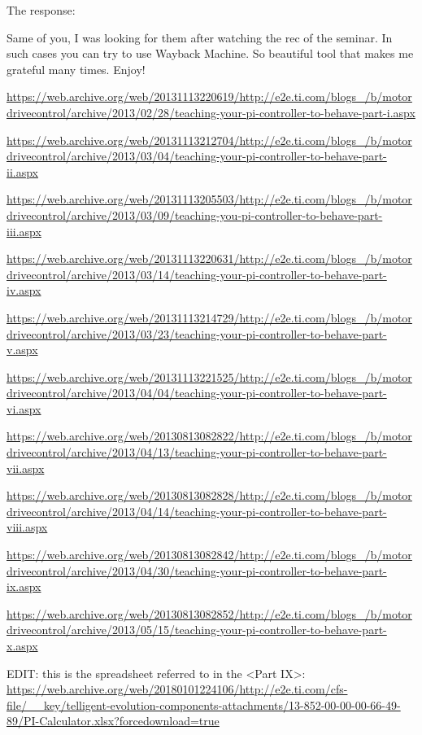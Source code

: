 \documentclass[11pt,a4paper]{report}
\begin{document}
    The response:
    \begin{displayquote}
        Same of you, I was looking for them after watching the rec of the seminar. In such cases you can try to use Wayback Machine. So beautiful tool that makes me grateful many times. Enjoy!

        \url{https://web.archive.org/web/20131113220619/http://e2e.ti.com/blogs_/b/motordrivecontrol/archive/2013/02/28/teaching-your-pi-controller-to-behave-part-i.aspx}

        \url{https://web.archive.org/web/20131113212704/http://e2e.ti.com/blogs_/b/motordrivecontrol/archive/2013/03/04/teaching-your-pi-controller-to-behave-part-ii.aspx}

        \url{https://web.archive.org/web/20131113205503/http://e2e.ti.com/blogs_/b/motordrivecontrol/archive/2013/03/09/teaching-you-pi-controller-to-behave-part-iii.aspx}

        \url{https://web.archive.org/web/20131113220631/http://e2e.ti.com/blogs_/b/motordrivecontrol/archive/2013/03/14/teaching-your-pi-controller-to-behave-part-iv.aspx}

        \url{https://web.archive.org/web/20131113214729/http://e2e.ti.com/blogs_/b/motordrivecontrol/archive/2013/03/23/teaching-your-pi-controller-to-behave-part-v.aspx}

        \url{https://web.archive.org/web/20131113221525/http://e2e.ti.com/blogs_/b/motordrivecontrol/archive/2013/04/04/teaching-your-pi-controller-to-behave-part-vi.aspx}

        \url{https://web.archive.org/web/20130813082822/http://e2e.ti.com/blogs_/b/motordrivecontrol/archive/2013/04/13/teaching-your-pi-controller-to-behave-part-vii.aspx}

        \url{https://web.archive.org/web/20130813082828/http://e2e.ti.com/blogs_/b/motordrivecontrol/archive/2013/04/14/teaching-your-pi-controller-to-behave-part-viii.aspx}

        \url{https://web.archive.org/web/20130813082842/http://e2e.ti.com/blogs_/b/motordrivecontrol/archive/2013/04/30/teaching-your-pi-controller-to-behave-part-ix.aspx}

        \url{https://web.archive.org/web/20130813082852/http://e2e.ti.com/blogs_/b/motordrivecontrol/archive/2013/05/15/teaching-your-pi-controller-to-behave-part-x.aspx}

        EDIT: this is the spreadsheet referred to in the <Part IX>: \url{https://web.archive.org/web/20180101224106/http://e2e.ti.com/cfs-file/__key/telligent-evolution-components-attachments/13-852-00-00-00-66-49-89/PI-Calculator.xlsx?forcedownload=true}
    \end{displayquote}
\end{document}
